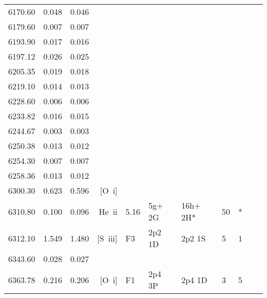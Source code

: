 \begin{longtable}{lrlrlllllll}
 6170.60 &   0.048 &   0.046                                                                                      \\
 6179.60 &   0.007 &   0.007                                                                                      \\
 6193.90 &   0.017 &   0.016                                                                                      \\
 6197.12 &   0.026 &   0.025                                                                                      \\
 6205.35 &   0.019 &   0.018                                                                                      \\
 6219.10 &   0.014 &   0.013                                                                                      \\
 6228.60 &   0.006 &   0.006                                                                                      \\
 6233.82 &   0.016 &   0.015                                                                                      \\
 6244.67 &   0.003 &   0.003                                                                                      \\
 6250.38 &   0.013 &   0.012                                                                                      \\
 6254.30 &   0.007 &   0.007                                                                                      \\
 6258.36 &   0.013 &   0.012                                                                                      \\
 6300.30 &   0.623 &   0.596 & [O~{\sc i}]                                                                        \\
 6310.80 &   0.100 &   0.096 &  He~{\sc ii}     &  5.16      &  5g+ 2G    &  16h+ 2H*  &         50 &        *    \\
 6312.10 &   1.549 &   1.480 &  [S~{\sc iii}]   &  F3        &  2p2 1D    &  2p2 1S    &          5 &        1    \\
 6343.60 &   0.028 &   0.027                                                                                      \\
 6363.78 &   0.216 &   0.206 &  [O~{\sc i}]     &  F1        &  2p4 3P    &  2p4 1D    &          3 &        5    \\

\end{longtable}
